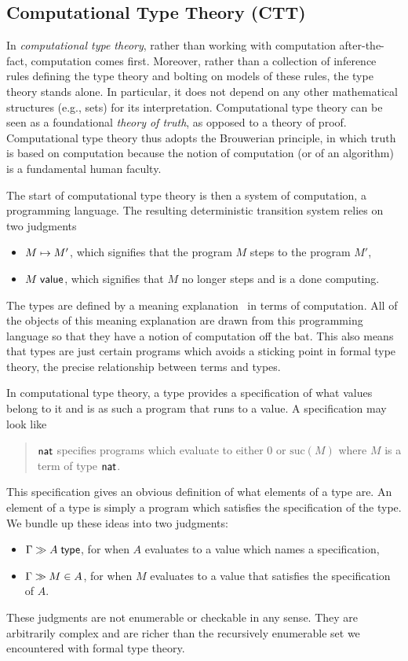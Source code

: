 \documentclass{article}
\begin{document}
\subsection{Computational Type Theory (CTT)}
In \emph{computational type theory}, rather than working with computation
after-the-fact, computation comes first. Moreover, rather than a collection
of inference rules defining the type theory and bolting on models of
these rules, the type theory stands alone.  In particular, it does not depend on any other
mathematical structures (e.g., sets) for its interpretation.  Computational type theory
can be seen as a foundational \emph{theory of truth}, as opposed to a theory of
proof.  Computational type theory thus adopts the Brouwerian principle, in which truth is based on
computation because the notion of computation (or of an algorithm) is a fundamental human faculty.

The start of computational type theory is then a system of
computation, a programming language.  The resulting deterministic transition system relies on two
judgments
\begin{itemize}
\item $M \mapsto M'$, which signifies that the program $M$ steps to the
  program $M'$,
\item $M\;\mathsf{value}$,  which signifies that $M$ no longer steps and is a
  done computing.
\end{itemize}
The types are defined by a meaning explanation~\citep{MartinLof:79} in
terms of computation. All of the objects of this meaning explanation
are drawn from this programming language so that they have a notion of
computation off the bat. This also means that types are just certain
programs which avoids a sticking point in formal type theory, the
precise relationship between terms and types.

In computational type theory, a type provides a specification of what values belong to it and
is as such a program that runs to a value.  %
A specification may look like
\begin{quote}
  $\mathsf{nat}$ specifies programs which evaluate to either $0$ or
  $\mathrm{suc}(M)$ where $M$ is a term of type $\mathsf{nat}$.
\end{quote}
This specification gives an obvious definition of what elements of a
type are. An element of a type is simply a program which satisfies the
specification of the type. We bundle up these ideas into two
judgments:
\begin{itemize}
\item $\hasTC{\Gamma}{A}$, for when $A$ evaluates to a value
  which names a specification,
\item $\hasEC{\Gamma}{M}{A}$, for when $M$ evaluates to a value that satisfies the
  specification of $A$.
\end{itemize}
These judgments are not enumerable or checkable in any sense. They are
arbitrarily complex and are richer than the recursively enumerable set
we encountered with formal type theory.
\end{document}
